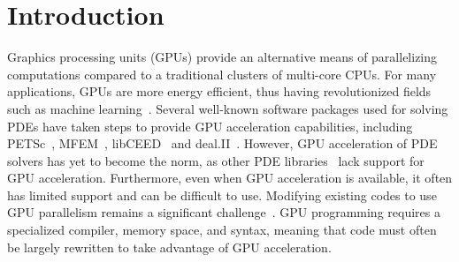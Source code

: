 \section*{Introduction}
Graphics processing units (GPUs) provide an alternative means of parallelizing computations compared to a traditional clusters of multi-core CPUs. For many applications, GPUs are more energy efficient, thus having revolutionized fields such as machine learning~\citep{navarro2014survey}. Several well-known software packages used for solving PDEs have taken steps to provide GPU acceleration capabilities, including PETSc~\citep{MILLS2021102831}, MFEM~\citep{anderson2021mfem}, libCEED~\citep{abdelfattah2021gpu} and deal.II~\citep{arndt2021deal}.
However, GPU acceleration of PDE solvers has yet to become the norm, as other PDE libraries~\citep{baratta2023dolfinx,schoberl2014c++,hecht2012new,moxey2020nektar++,FiredrakeUserManual} lack support for GPU acceleration. Furthermore, even when GPU acceleration is available, it often has limited support and can be difficult to use. Modifying existing codes to use GPU parallelism remains a significant challenge~\citep{MILLS2021102831}. GPU programming requires a specialized compiler, memory space, and syntax, meaning that code must often be largely rewritten to take advantage of GPU acceleration.


